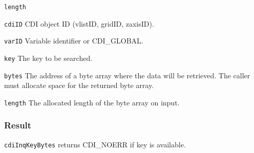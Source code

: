\hspace*{4mm}\begin{minipage}[]{15cm}
\begin{deflist}{\texttt{length}\ }
\item[\texttt{cdiID}]
CDI object ID (vlistID, gridID, zaxisID).
\item[\texttt{varID}]
Variable identifier or CDI\_GLOBAL.
\item[\texttt{key}]
The key to be searched.
\item[\texttt{bytes}]
The address of a byte array where the data will be retrieved.
                    The caller must allocate space for the returned byte array.
\item[\texttt{length}]
The allocated length of the byte array on input.
\end{deflist}
\end{minipage}

\subsubsection*{Result}

{\texttt{cdiInqKeyBytes}} returns CDI\_NOERR if key is available.

